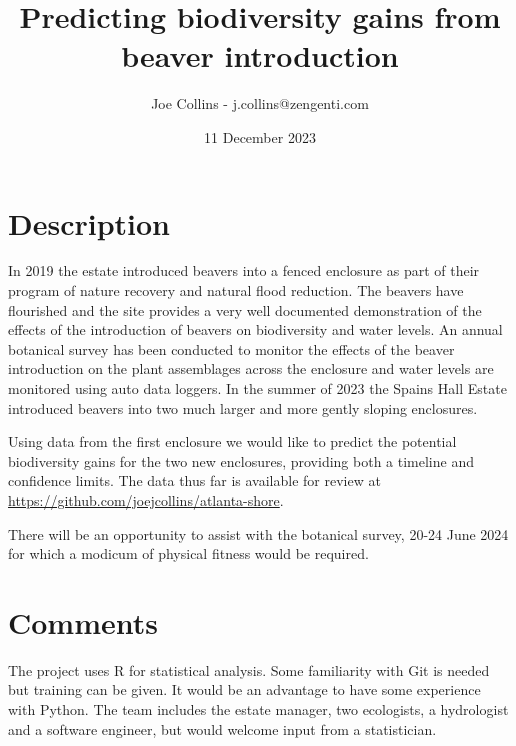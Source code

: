 \documentclass{roles}
\title{Predicting biodiversity gains from beaver introduction}
\author{Joe Collins - j.collins@zengenti.com}
\date{11 December 2023}
\begin{document}
\maketitle

\section*{Description}

In 2019 the estate introduced beavers into a fenced enclosure
as part of their program of nature recovery and natural flood reduction.
The beavers have flourished and the site provides a very well documented demonstration
of the effects of the introduction of beavers on biodiversity and water levels.
An annual botanical survey has been conducted to monitor the effects of the beaver introduction
on the plant assemblages across the enclosure and water levels are monitored using auto data loggers.
In the summer of 2023 the Spains Hall Estate introduced beavers into two much larger
and more gently sloping enclosures.

Using data from the first enclosure we would like to predict the potential biodiversity gains for the two new enclosures,
providing both a timeline and confidence limits.
The data thus far is available for review at
\href{https://github.com/joejcollins/atlanta-shore}{https://github.com/joejcollins/atlanta-shore}. 

There will be an opportunity to assist with the botanical survey,
20-24 June 2024 for which a modicum of physical fitness would be required.

\section*{Comments}

The project uses R for statistical analysis.
Some familiarity with Git is needed but training can be given.
It would be an advantage to have some experience with Python.
The team includes the estate manager, two ecologists, a hydrologist and a software engineer,
but would welcome input from a statistician.
\end{document}
